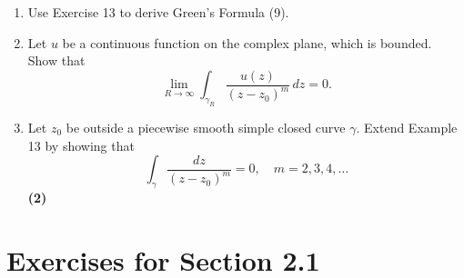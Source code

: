\documentclass[12pt]{article}
\theoremstyle{definition} %
\theoremstyle{plain} %
\begin{document}
\begin{enumerate}
    \item Use Exercise 13 to derive Green’s Formula (9).
    \item Let $u$ be a continuous function on the complex plane, which is bounded. Show that
    \[
    \lim_{R \to \infty} \int_{\gamma_R} \frac{u(z)}{(z - z_0)^m} \, dz = 0.
    \]
    \item Let $z_0$ be outside a piecewise smooth simple closed curve $\gamma$. Extend Example 13 by showing that
    \[
    \int_\gamma \frac{dz}{(z - z_0)^m} = 0, \quad m = 2, 3, 4, \ldots
    \]
    \quad \textbf{(2)} 
\end{enumerate}

\section*{Exercises for Section 2.1}
\end{document}
